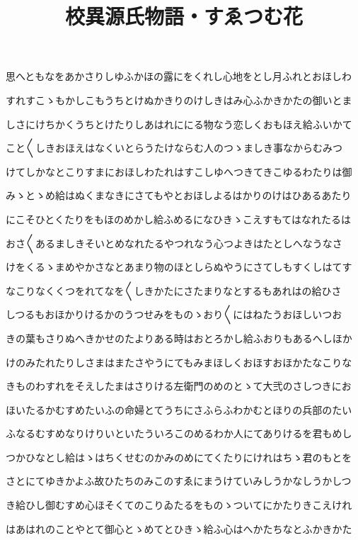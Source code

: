 \documentclass[a4paper,11pt,landscape]{ltjtarticle}
\title{校異源氏物語・すゑつむ花}
\date{}
\begin{document}
\maketitle

思へともなをあかさりしゆふかほの露にをくれし心地をとし月ふれとおほしわ
\par\medskip
すれすこゝもかしこもうちとけぬかきりのけしきはみ心ふかきかたの御いとま
\par\medskip
しさにけちかくうちとけたりしあはれににる物なう恋しくおもほえ給ふいかて
\par\medskip
こと〱しきおほえはなくいとらうたけならむ人のつゝましき事なからむみつ
\par\medskip
けてしかなとこりすまにおほしわたれはすこしゆへつきてきこゆるわたりは御
\par\medskip
みゝとゝめ給はぬくまなきにさてもやとおほしよるはかりのけはひあるあたり
\par\medskip
にこそひとくたりをもほのめかし給ふめるになひきゝこえすもてはなれたるは
\par\medskip
おさ〱あるましきそいとめなれたるやつれなう心つよきはたとしへなうなさ
\par\medskip
けをくるゝまめやかさなとあまり物のほとしらぬやうにさてしもすくしはてす
\par\medskip
なこりなくくつをれてなを〱しきかたにさたまりなとするもあれはの給ひさ
\par\medskip
しつるもおほかりけるかのうつせみをものゝおり〱にはねたうおほしいつお
\par\medskip
きの葉もさりぬへきかせのたよりある時はおとろかし給ふおりもあるへしほか
\par\medskip
けのみたれたりしさまはまたさやうにてもみまほしくおほすおほかたなこりな
\par\medskip
きものわすれをそえしたまはさりける左衛門のめのとゝて大弐のさしつきにお
\par\medskip
ほいたるかむすめたいふの命婦とてうちにさふらふわかむとほりの兵部のたい
\par\medskip
ふなるむすめなりけりいといたういろこのめるわか人にてありけるを君もめし
\par\medskip
つかひなとし給はゝはちくせむのかみのめにてくたりにけれはちゝ君のもとを
\par\medskip
さとにてゆきかよふ故ひたちのみこのすゑにまうけていみしうかなしうかしつ
\par\medskip
き給ひし御むすめ心ほそくてのこりゐたるをものゝついてにかたりきこえけれ
\par\medskip
はあはれのことやとて御心とゝめてとひきゝ給ふ心はへかたちなとふかきかた
\end{document}
